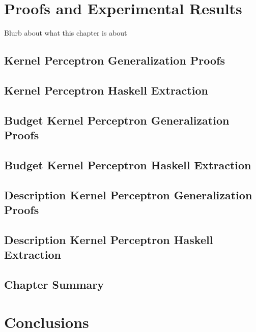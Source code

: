 \chapter{Proofs and Experimental Results}\label{ResultsChapter}
Blurb about what this chapter is about 
\section{Kernel Perceptron Generalization Proofs}\label{KPProofs}
\section{Kernel Perceptron Haskell Extraction}\label{KPHaskell}
\section{Budget Kernel Perceptron Generalization Proofs}\label{KPBProofs}
\section{Budget Kernel Perceptron Haskell Extraction}\label{KPBHaskell}
\section{Description Kernel Perceptron Generalization Proofs}\label{KPDProofs}
\section{Description Kernel Perceptron Haskell Extraction}\label{KPDHaskell}
\section{Chapter Summary}\label{ResultsChapterSummarySection}
\chapter{Conclusions}\label{ConclusionsChapter}
